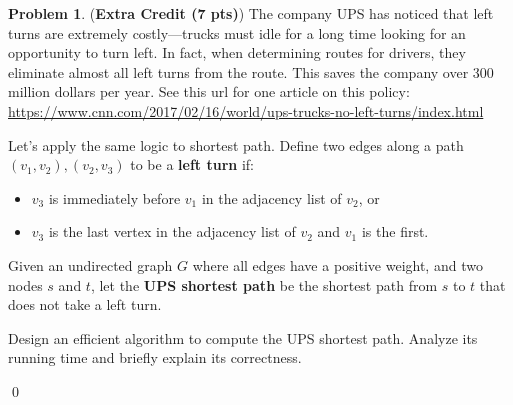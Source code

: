 \documentclass[12pt]{article}
\theoremstyle{definition}
\newtheorem{question}{Problem}
\newenvironment{solution}{\bigskip\noindent{\it Solution.}  \ignorespaces}{\hfill\qed}
\begin{document}
\newpage
\begin{question}({\bf Extra Credit (7 pts)})
  The company UPS has noticed that left turns are extremely costly---trucks must idle for a long time looking for an opportunity to turn left.  In fact, when determining routes for drivers, they eliminate almost all left turns from the route.  This saves the company over 300 million dollars per year.  See this url for one article on this policy: \url{https://www.cnn.com/2017/02/16/world/ups-trucks-no-left-turns/index.html}

  Let's apply the same logic to shortest path.  Define two edges along a path $(v_1,v_2), (v_2, v_3)$ to be a \textbf{left turn} if:
  \begin{itemize}[topsep=0pt,noitemsep]
    \item $v_3$ is immediately before $v_1$ in the adjacency list of $v_2$, or 
    \item $v_3$ is the last vertex in the adjacency list of $v_2$ and $v_1$ is the first.
  \end{itemize}

  Given an undirected graph $G$ where all edges have a positive weight, and two nodes $s$ and $t$, let the \textbf{UPS shortest path} be the shortest path from $s$ to $t$ that does not take a left turn.

  Design an efficient algorithm to compute the {UPS shortest path}.  Analyze its running time and briefly explain its correctness.
\end{question}
\begin{solution}
\end{solution}


\end{document}
